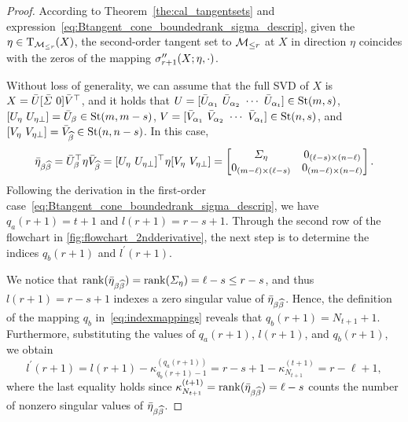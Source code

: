 \begin{proof}
    According to Theorem~\ref{the:cal_tangentsets} and expression~\eqref{eq:Btangent_cone_boundedrank_sigma_descrip}, given the $\eta\in\mathrm{T}_{\mathcal{M}_{\le r}}(X)$, the second-order tangent set to $\mathcal{M}_{\le r}$ at $X$ in direction $\eta$ coincides with the zeros of the mapping $\sigma_{r+1}^{\prime\prime}(X;\eta,\cdot)$.

    Without loss of generality, we can assume that the full SVD of $X$ is $X=\bar{U}[\bar{\varSigma}\ 0]\bar{V}^\top$, and it holds that $U=[\bU_{\alpha_1}\ \bU_{\alpha_2}\ \cdots\ \bU_{\alpha_t}]\in\stiefel(m,s)$, $[U_\eta\ U_{\eta\bot}]=\bU_{\beta}\in\stiefel(m,m-s)$, $V=[\bV_{\alpha_1}\ \bV_{\alpha_2}\ \cdots\ \bV_{\alpha_t}]\in\stiefel(n,s)$, and $[V_\eta\ V_{\eta\bot}]=\bV_{\widehat{\beta}}\in\stiefel(n,n-s)$. In this case, 
    \begin{equation}\label{eq:decompose_bareta}
        \bareta_{\beta\widehat{\beta}}=\bU_\beta^\top\eta \bV_{\widehat{\beta}}=[U_\eta\ U_{\eta\bot}]^\top\eta[V_\eta\ V_{\eta\bot}]=\left[ \begin{matrix}
        	\varSigma _{\eta}&		0_{(\ell-s)\times (n-\ell)}\\
        	0_{(m-\ell)\times(\ell-s)}&		0_{(m-\ell)\times(n-\ell)}\\
        \end{matrix} \right].
    \end{equation}
    Following the derivation in the first-order case~\eqref{eq:Btangent_cone_boundedrank_sigma_descrip}, we have $q_a(r+1)=t+1$ and $l(r+1)=r-s+1$. Through the second row of the flowchart in \myfig\ref{fig:flowchart_2ndderivative}, the next step is to determine the indices $q_b(r+1)$ and $l^\prime(r+1)$. 

    We notice that $\operatorname{rank}(\bar{\eta}_{\beta\widehat{\beta}})=\operatorname{rank}(\varSigma_\eta)=\ell-s\le r-s$, and thus $l(r+1)=r-s+1$ indexes a zero singular value of $\bar{\eta}_{\beta\widehat{\beta}}$. Hence, the definition of the mapping $q_b$ in~\eqref{eq:indexmappings} reveals that $q_b(r+1)=N_{t+1}+1$. Furthermore, substituting the values of $q_a(r+1)$, $l(r+1)$, and $q_b(r+1)$, we obtain
    \begin{equation*}
        l^\prime(r+1)=l(r+1)-\kappa^{(q_a(r+1))}_{q_b(r+1)-1}=r-s+1 - \kappa^{(t+1)}_{N_{t+1}}=r-\ell+1,
    \end{equation*}
    where the last equality holds since $\kappa^{(t+1)}_{N_{t+1}}=\operatorname{rank}(\bar{\eta}_{\beta\widehat{\beta}})=\ell-s$ counts the number of nonzero singular values of $\bar{\eta}_{\beta\widehat{\beta}}$.


\end{proof}
